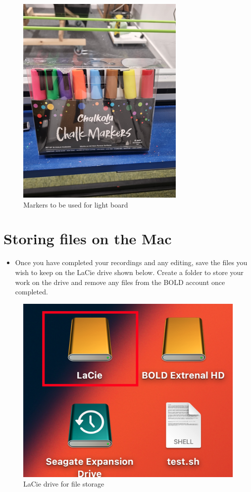 \documentclass[
]{book}
\providecommand{\tightlist}{%
  \setlength{\itemsep}{0pt}\setlength{\parskip}{0pt}}
\begin{document}
\begin{figure}

{\centering \includegraphics[width=0.6\linewidth]{Pens} 

}

\caption{Markers to be used for light board}\label{fig:pens}
\end{figure}

\hypertarget{storing-files-on-the-mac}{%
\section{Storing files on the Mac}\label{storing-files-on-the-mac}}

\begin{itemize}
\tightlist
\item
  Once you have completed your recordings and any editing, save the files you wish to keep on the LaCie drive shown below. Create a folder to store your work on the drive and remove any files from the BOLD account once completed.
\end{itemize}

\begin{figure}

{\centering \includegraphics[width=0.4\linewidth]{Lacie} 

}

\caption{LaCie drive for file storage}\label{fig:lacie}
\end{figure}
\end{document}
